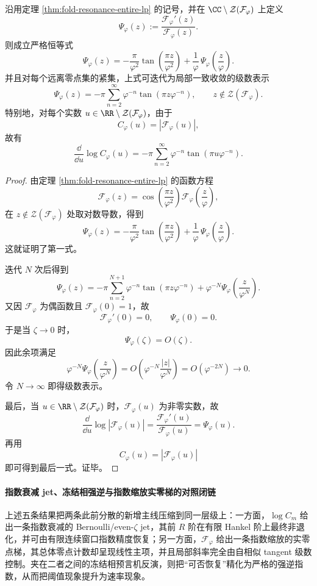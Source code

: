 \begin{theorem}\label{thm:xi-fold-resonance-logderivative-selfsimilar}
沿用定理 \ref{thm:fold-resonance-entire-lp} 的记号，并在
\(\CC\setminus\mathcal Z(\mathcal F_\varphi)\) 上定义
\[
\Psi_\varphi(z):=\frac{\mathcal F_\varphi'(z)}{\mathcal F_\varphi(z)}.
\]
则成立严格恒等式
\[
\boxed{\;
\Psi_\varphi(z)=
-\frac{\pi}{\varphi^2}\tan\!\left(\frac{\pi z}{\varphi^2}\right)
+\frac{1}{\varphi}\,\Psi_\varphi\!\left(\frac{z}{\varphi}\right).
\;}
\]
并且对每个远离零点集的紧集，上式可迭代为局部一致收敛的级数表示
\[
\boxed{\;
\Psi_\varphi(z)=
-\pi\sum_{n=2}^{\infty}\varphi^{-n}\tan(\pi z\varphi^{-n}),
\qquad
z\notin \mathcal Z(\mathcal F_\varphi).
\;}
\]
特别地，对每个实数 \(u\in\RR\setminus\mathcal Z(\mathcal F_\varphi)\)，由于
\[
C_\varphi(u)=|\mathcal F_\varphi(u)|,
\]
故有
\[
\boxed{\;
\frac{\dd}{\dd u}\log C_\varphi(u)
=
-\pi\sum_{n=2}^{\infty}\varphi^{-n}\tan(\pi u\varphi^{-n}).
\;}
\]
\end{theorem}
\begin{proof}
由定理 \ref{thm:fold-resonance-entire-lp} 的函数方程
\[
\mathcal F_\varphi(z)=
\cos\!\left(\frac{\pi z}{\varphi^2}\right)
\mathcal F_\varphi\!\left(\frac{z}{\varphi}\right),
\]
在 \(z\notin \mathcal Z(\mathcal F_\varphi)\) 处取对数导数，得到
\[
\Psi_\varphi(z)=
-\frac{\pi}{\varphi^2}\tan\!\left(\frac{\pi z}{\varphi^2}\right)
+\frac{1}{\varphi}\,\Psi_\varphi\!\left(\frac{z}{\varphi}\right).
\]
这就证明了第一式。

迭代 \(N\) 次后得到
\[
\Psi_\varphi(z)=
-\pi\sum_{n=2}^{N+1}\varphi^{-n}\tan(\pi z\varphi^{-n})
+\varphi^{-N}\Psi_\varphi\!\left(\frac{z}{\varphi^{N}}\right).
\]
又因 \(\mathcal F_\varphi\) 为偶函数且 \(\mathcal F_\varphi(0)=1\)，故
\[
\mathcal F_\varphi'(0)=0,
\qquad
\Psi_\varphi(0)=0.
\]
于是当 \(\zeta\to 0\) 时，
\[
\Psi_\varphi(\zeta)=O(\zeta).
\]
因此余项满足
\[
\varphi^{-N}\Psi_\varphi\!\left(\frac{z}{\varphi^{N}}\right)
=
O\!\left(\varphi^{-N}\frac{|z|}{\varphi^{N}}\right)
=
O(\varphi^{-2N})\to 0.
\]
令 \(N\to\infty\) 即得级数表示。

最后，当 \(u\in\RR\setminus \mathcal Z(\mathcal F_\varphi)\) 时，\(\mathcal F_\varphi(u)\) 为非零实数，故
\[
\frac{\dd}{\dd u}\log|\mathcal F_\varphi(u)|
=
\frac{\mathcal F_\varphi'(u)}{\mathcal F_\varphi(u)}
=
\Psi_\varphi(u).
\]
再用
\[
C_\varphi(u)=|\mathcal F_\varphi(u)|
\]
即可得到最后一式。证毕。
\end{proof}

\paragraph{指数衰减 jet、冻结相强逆与指数缩放实零梯的对照闭链}
上述五条结果把两条此前分散的新增主线压缩到同一层级上：一方面，\(\log C_m\) 给出一条指数衰减的 Bernoulli/even-\(\zeta\) jet，其前 \(R\) 阶在有限 Hankel 阶上最终非退化，并可由有限连续窗口指数精度恢复；另一方面，\(\mathcal F_\varphi\) 给出一条指数缩放的实零点梯，其总体零点计数却呈现线性主项，并且局部斜率完全由自相似 tangent 级数控制。夹在二者之间的冻结相预言机反演，则把“可否恢复”精化为严格的强逆指数，从而把阈值现象提升为速率现象。
